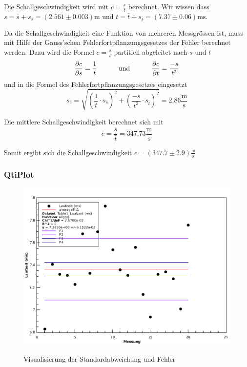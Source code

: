 Die Schallgeschwindigkeit wird mit $c=\frac{s}{t}$ berechnet. Wir wissen dass
$s=\bar{s}+s_{\bar{s}}=(2.561\pm0.003) \textrm{m}$
und
$t=\bar{t}+s_{\bar{t}}=(7.37\pm0.06) \textrm{ms}$.

Da die Schallgeschwindigkeit eine Funktion von mehreren Messgr\"ossen ist, muss mit Hilfe der
Gauss'schen Fehlerfortpflanzungsgesetzes der Fehler berechnet werden. Dazu wird die Formel $c=\frac{s}{t}$
partitiell abgeleitet nach $s$ und $t$
\[ \frac{\partial c}{\partial s} = \frac{1}{t} \textrm{\hspace{10mm} und \hspace{10mm}} \frac{\partial c}{\partial{t}} = \frac{-s}{t^2} \]
und in die Formel des Fehlerfortpflanzungsgesetzes eingesetzt
\[ s_{\bar{c}} = \sqrt{(\frac{1}{t} \cdot s_{\bar{s}})^2 + (\frac{-s}{t^2} \cdot s_{\bar{t}})^2} = 2.86 \frac{\textrm{m}}{\textrm{s}} \]

Die mittlere Schallgeschwindigkeit berechnet sich mit
\[ \bar{c}=\frac{\bar{s}}{\bar{t}} = 347.73 \frac{\textrm{m}}{\textrm{s}} \]

Somit ergibt sich die Schallgeschwindigkeit
\underline{\underline{$c=(347.7 \pm 2.9) \frac{\textrm{m}}{\textrm{s}}$}}


\subsubsection*{QtiPlot}

\begin{figure}[H]
    \center
    \caption{Visualisierung der Standardabweichung und Fehler}
    \includegraphics[width=.85\textwidth]{qtiplot/schallgeschwindigkeit}
    \label{fig:schallgeschwindigkeit}
\end{figure}

